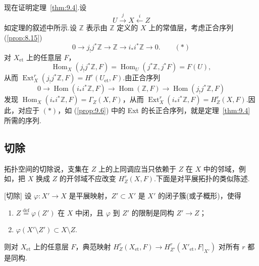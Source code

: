现在证明定理~\ref{thm:9.4}.设
\[
U \xrightarrow{j} X \xleftarrow{i} Z
\]
如定理的叙述中所示.设 $\mathbb{Z}$ 表示由 $\mathbb{Z}$ 定义的 $X$ 上的常值层，考虑正合序列 (\ref{prop:8.15})
\[
0 \to j_{!}j^{*}\mathbb{Z} \to \mathbb{Z} \to i_{*}i^{*}\mathbb{Z} \to 0. \qquad (*)
\]
对 $X_{\mathrm{et}}$ 上的任意层 $F$，
\[
\operatorname{Hom}_X(j_{!}j^{*}\mathbb{Z}, F) = \operatorname{Hom}_U(j^{*}\mathbb{Z}, j^{*}F) = F(U),
\]
从而 $\operatorname{Ext}^{r}_{X}(j_{!}j^{*}\mathbb{Z}, F) = H^{r}(U_{\mathrm{et}}, F)$.由正合序列
\[
0 \to \operatorname{Hom}(i_{*}i^{*}\mathbb{Z}, F) \to \operatorname{Hom}(\mathbb{Z}, F) \to \operatorname{Hom}(j_{!}j^{*}\mathbb{Z}, F)
\]
发现 $\operatorname{Hom}_X(i_{*}i^{*}\mathbb{Z}, F) = \Gamma_Z(X, F)$，从而 $\operatorname{Ext}^{r}_{X}(i_{*}i^{*}\mathbb{Z}, F) = H^{r}_{Z}(X, F)$.因此，对应于 $(*)$，如 (\ref{prop:9.6}) 中的 Ext 的长正合序列，就是定理~\ref{thm:9.4} 所需的序列.

\subsection*{切除}

拓扑空间的切除说，支集在 $Z$ 上的上同调应当只依赖于 $Z$ 在 $X$ 中的邻域，例如，把 $X$ 换成 $Z$ 的开邻域不应改变 $H^{r}_{Z}(X, F)$.下面是对平展拓扑的类似陈述.

\begin{theorem}\label{thm:9.7}[切除]
设 $\varphi \colon X' \to X$ 是平展映射，$Z' \subset X'$ 是 $X'$ 的闭子簇(或子概形)，使得
\begin{enumerate}
  \item $Z \overset{\mathrm{def}}{=} \varphi(Z')$ 在 $X$ 中闭，且 $\varphi$ 到 $Z'$ 的限制是同构 $Z' \to Z$；
  \item $\varphi(X' \setminus Z') \subset X \setminus Z$.
\end{enumerate}
则对 $X_{\mathrm{et}}$ 上的任意层 $F$，典范映射 $H^{r}_{Z}(X_{\mathrm{et}}, F) \to H^{r}_{Z'}(X'_{\mathrm{et}}, F|_{X'})$ 对所有 $r$ 都是同构.
\end{theorem}

